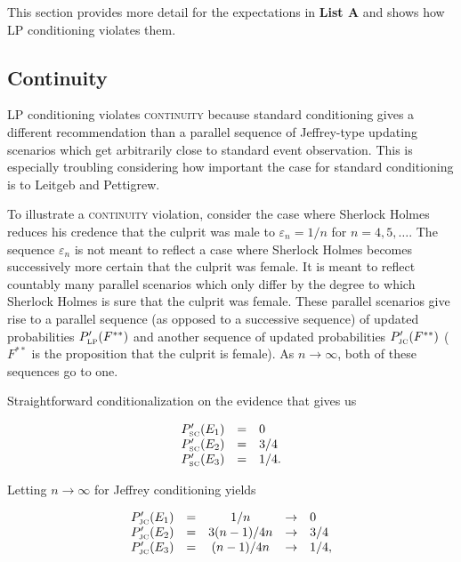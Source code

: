 \documentclass[smallextended]{svjour3}       %
\begin{document}
This section provides more detail for the expectations in \textbf{List
  A} and shows how LP conditioning violates them.

\subsection{Continuity}
\label{Continuity}

LP conditioning violates \textsc{continuity} because standard
conditioning gives a different recommendation than a parallel sequence
of Jeffrey-type updating scenarios which get arbitrarily close to
standard event observation. This is especially troubling considering
how important the case for standard conditioning is to Leitgeb and
Pettigrew.

To illustrate a \textsc{continuity} violation, consider the case where
Sherlock Holmes reduces his credence that the culprit was male to
$\varepsilon_{n}=1/n$ for $n=4,5,\ldots$. The sequence
$\varepsilon_{n}$ is not meant to reflect a case where Sherlock Holmes
becomes successively more certain that the culprit was female. It is
meant to reflect countably many parallel scenarios which only differ
by the degree to which Sherlock Holmes is sure that the culprit was
female. These parallel scenarios give rise to a parallel sequence (as
opposed to a successive sequence) of updated probabilities
$P'_{\mbox{\tiny LP}}(F^{**})$ and another sequence of updated
probabilities $P'_{\mbox{\tiny JC}}(F^{**})$ ($F^{**}$ is the
proposition that the culprit is female). As $n\rightarrow\infty$, both
of these sequences go to one.

Straightforward conditionalization on the evidence that  gives us 

\begin{equation}
  \label{eq:sherlockcontsc}
  \begin{array}{rcl}
  P'_{\mbox{\tiny SC}}(E_{1})&=&0\\
  P'_{\mbox{\tiny SC}}(E_{2})&=&3/4\\
  P'_{\mbox{\tiny SC}}(E_{3})&=&1/4.
\end{array}
\end{equation}

Letting $n\rightarrow\infty$ for Jeffrey conditioning yields

\begin{equation}
  \label{eq:sherlockcontjc}
  \begin{array}{rcccl}
  P'_{\mbox{\tiny JC}}(E_{1})&=&1/n&\rightarrow&0\\
  P'_{\mbox{\tiny JC}}(E_{2})&=&3(n-1)/4n&\rightarrow&3/4\\
  P'_{\mbox{\tiny JC}}(E_{3})&=&(n-1)/4n&\rightarrow&1/4,
\end{array}
\end{equation}
\end{document}
